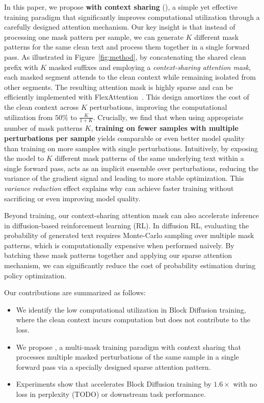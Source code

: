 In this paper, we propose \textbf{\NAME{} with context sharing} (\textbf{\name{}}), a simple yet effective training paradigm that significantly improves computational utilization through a carefully designed attention mechanism.
Our key insight is that instead of processing one mask pattern per sample, we can generate $K$ different mask patterns for the same clean text and process them together in a single forward pass.
As illustrated in Figure~\ref{fig:method}, by concatenating the shared clean prefix with $K$ masked suffixes and employing a \emph{context-sharing attention mask}, each masked segment attends to the clean context while remaining isolated from other segments.
The resulting attention mask is highly sparse and can be efficiently implemented with FlexAttention~\citep{flexattention}.
This design amortizes the cost of the clean context across $K$ perturbations, improving the computational utilization from $50\%$ to $\frac{K}{1+K}$.
Crucially, we find that when using appropriate number of mask patterns $K$, \textbf{training on fewer samples with multiple perturbations per sample} yields comparable or even better model quality than training on more samples with single perturbations.
Intuitively, by exposing the model to $K$ different mask patterns of the same underlying text within a single forward pass, \name{} acts as an implicit ensemble over perturbations, reducing the variance of the gradient signal and leading to more stable optimization.
This \emph{variance reduction} effect explains why \name{} can achieve faster training without sacrificing or even improving model quality.

Beyond training, our context-sharing attention mask can also accelerate inference in diffusion-based reinforcement learning (RL).
In diffusion RL, evaluating the probability of generated text requires Monte-Carlo sampling over multiple mask patterns, which is computationally expensive when performed naively.
By batching these mask patterns together and applying our sparse attention mechanism, we can significantly reduce the cost of probability estimation during policy optimization.

Our contributions are summarized as follows:
\begin{itemize}[parsep=0pt,itemsep=3pt,topsep=0pt]
    \item We identify the low computational utilization in Block Diffusion training, where the clean context incurs computation but does not contribute to the loss.
    \item We propose \name{}, a multi-mask training paradigm with context sharing that processes multiple masked perturbations of the same sample in a single forward pass via a specially designed sparse attention pattern.
    \item Experiments show that \name{} accelerates Block Diffusion training by $1.6\times$ with no loss in perplexity (TODO) or downstream task performance.
\end{itemize}
